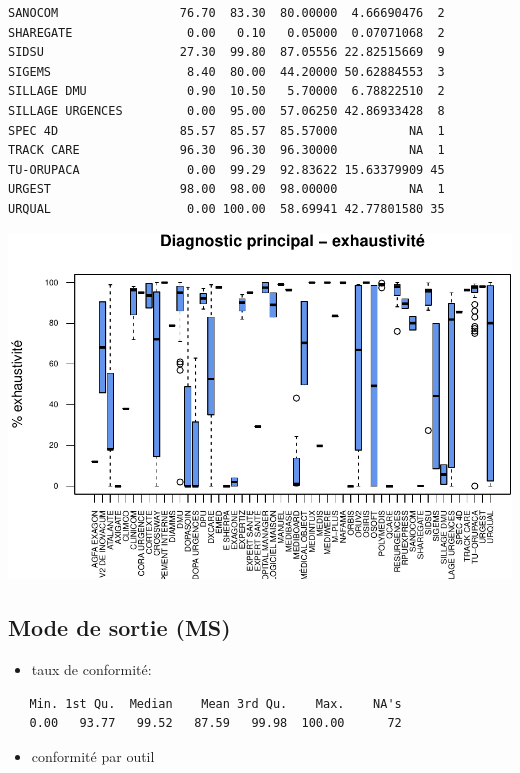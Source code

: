 \documentclass[]{article}
\begin{document}
\begin{verbatim}
SANOCOM                 76.70  83.30  80.00000  4.66690476  2
SHAREGATE                0.00   0.10   0.05000  0.07071068  2
SIDSU                   27.30  99.80  87.05556 22.82515669  9
SIGEMS                   8.40  80.00  44.20000 50.62884553  3
SILLAGE DMU              0.90  10.50   5.70000  6.78822510  2
SILLAGE URGENCES         0.00  95.00  57.06250 42.86933428  8
SPEC 4D                 85.57  85.57  85.57000          NA  1
TRACK CARE              96.30  96.30  96.30000          NA  1
TU-ORUPACA               0.00  99.29  92.83622 15.63379909 45
URGEST                  98.00  98.00  98.00000          NA  1
URQUAL                   0.00 100.00  58.69941 42.77801580 35
\end{verbatim}

\includegraphics{septembre2015_files/figure-latex/unnamed-chunk-20-1.pdf}

\subsection{Mode de sortie (MS)}\label{mode-de-sortie-ms}

\begin{itemize}
\itemsep1pt\parskip0pt
\item
  taux de conformité:
\end{itemize}

\begin{verbatim}
   Min. 1st Qu.  Median    Mean 3rd Qu.    Max.    NA's 
   0.00   93.77   99.52   87.59   99.98  100.00      72 
\end{verbatim}

\begin{itemize}
\itemsep1pt\parskip0pt
\item
  conformité par outil
\end{itemize}
\end{document}
